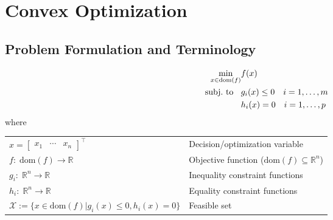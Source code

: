 \section{Convex Optimization}
\subsection{Problem Formulation and Terminology}
\noindent\begin{align*}
    \min_{x\in\mathrm{dom}(f)} & f(x)                          \\
    \text{subj.\ to\;\; }      & g_i(x)\leq0\quad i=1,\ldots,m \\
                               & h_{i}(x)=0\quad i=1,\ldots,p
\end{align*}
where
\renewcommand{\arraystretch}{1.3}
\setlength{\oldtabcolsep}{\tabcolsep}\setlength\tabcolsep{3pt}

\begin{tabularx}{\linewidth}{@{}lXX@{}}
    $x=\begin{bmatrix}
               x_1 & \cdots & x_n
           \end{bmatrix}^\top$
                                                                                            & \multicolumn{2}{l}{Decision/optimization variable                                }  \\
    $f:\;\mathrm{dom}(f) \to \mathbb{R}$                                                    & \multicolumn{2}{l}{Objective function ($\mathrm{dom}(f) \subseteq \mathbb{R}^n$) }  \\
    $g_i:\;\mathbb{R}^n \to \mathbb{R}$                                                     & \multicolumn{2}{l}{Inequality constraint functions                               }  \\
    $h_i:\;\mathbb{R}^n \to \mathbb{R}$                                                     & \multicolumn{2}{l}{Equality constraint functions                                  } \\
    \multicolumn{2}{l}{$\mathcal{X} := \{ x\in \mathrm{dom}(f) | g_i(x)\leq0, h_i(x)=0 \}$} & Feasible set
\end{tabularx}

